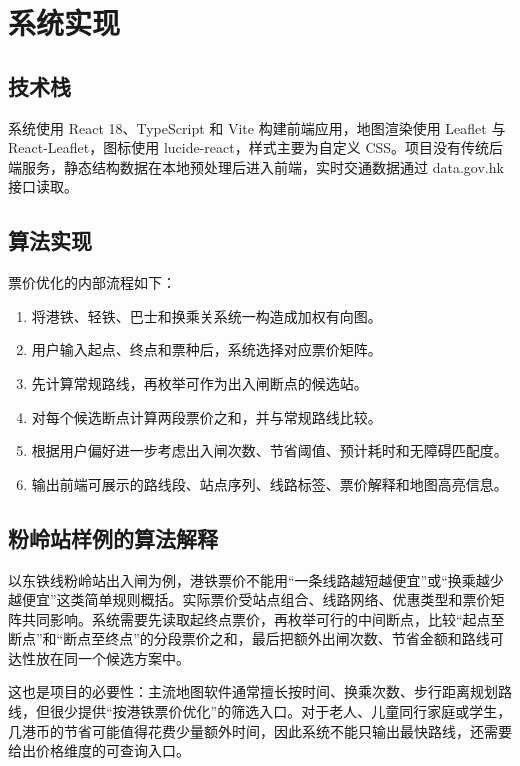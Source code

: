 \documentclass[UTF8,a4paper,11pt]{ctexart}
\begin{document}
\section{系统实现}

\subsection{技术栈}

系统使用 React 18、TypeScript 和 Vite 构建前端应用，地图渲染使用 Leaflet 与 React-Leaflet，图标使用 lucide-react，样式主要为自定义 CSS。项目没有传统后端服务，静态结构数据在本地预处理后进入前端，实时交通数据通过 data.gov.hk 接口读取。

\subsection{算法实现}

票价优化的内部流程如下：
\begin{enumerate}
  \item 将港铁、轻铁、巴士和换乘关系统一构造成加权有向图。
  \item 用户输入起点、终点和票种后，系统选择对应票价矩阵。
  \item 先计算常规路线，再枚举可作为出入闸断点的候选站。
  \item 对每个候选断点计算两段票价之和，并与常规路线比较。
  \item 根据用户偏好进一步考虑出入闸次数、节省阈值、预计耗时和无障碍匹配度。
  \item 输出前端可展示的路线段、站点序列、线路标签、票价解释和地图高亮信息。
\end{enumerate}

\subsection{粉岭站样例的算法解释}

以东铁线粉岭站出入闸为例，港铁票价不能用“一条线路越短越便宜”或“换乘越少越便宜”这类简单规则概括。实际票价受站点组合、线路网络、优惠类型和票价矩阵共同影响。系统需要先读取起终点票价，再枚举可行的中间断点，比较“起点至断点”和“断点至终点”的分段票价之和，最后把额外出闸次数、节省金额和路线可达性放在同一个候选方案中。

这也是项目的必要性：主流地图软件通常擅长按时间、换乘次数、步行距离规划路线，但很少提供“按港铁票价优化”的筛选入口。对于老人、儿童同行家庭或学生，几港币的节省可能值得花费少量额外时间，因此系统不能只输出最快路线，还需要给出价格维度的可查询入口。
\end{document}
